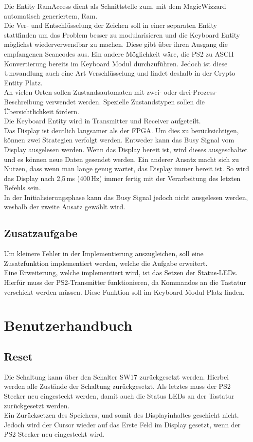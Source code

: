 \documentclass[a4paper,12pt]{report}
\begin{document}
	Die Entity RamAccess dient als Schnittstelle zum, mit dem MagicWizzard automatisch generiertem, Ram.\\
	Die Ver- und Entschlüsselung der Zeichen soll in einer separaten Entity stattfinden um das Problem besser zu modularisieren und die Keyboard Entity möglichst wiederverwendbar zu machen. Diese gibt über ihren Ausgang die empfangenen Scancodes aus. Ein andere Möglichkeit wäre, die PS2 zu ASCII Konvertierung bereits im Keyboard Modul durchzuführen. Jedoch ist diese Umwandlung auch eine Art Verschlüsselung und findet deshalb in der Crypto Entity Platz.\\
	An vielen Orten sollen Zustandsautomaten mit zwei- oder drei-Prozess-Beschreibung verwendet werden. Spezielle Zustandstypen sollen die Übersichtlichkeit fördern.\\
	Die Keyboard Entity wird in Transmitter und Receiver aufgeteilt.\\
	Das Display ist deutlich langsamer als der FPGA. Um dies zu berücksichtigen, können zwei Strategien verfolgt werden. Entweder kann das Busy Signal vom Display ausgelesen werden. Wenn das Display bereit ist, wird dieses ausgeschaltet und es können neue Daten gesendet werden. Ein anderer Ansatz macht sich zu Nutzen, dass wenn man lange genug wartet, das Display immer bereit ist. So wird das Display nach 2,5\,ms (400\,Hz) immer fertig mit der Verarbeitung des letzten Befehls sein. \\
	In der Initialisierungsphase kann das Busy Signal jedoch nicht ausgelesen werden, weshalb der zweite Ansatz gewählt wird.\\
	
	
	\section{Zusatzaufgabe}
		Um kleinere Fehler in der Implementierung auszugleichen, soll eine Zusatzfunktion implementiert werden, welche die Aufgabe erweitert.\\
		Eine Erweiterung, welche implementiert wird, ist das Setzen der Status-LEDs. Hierfür muss der PS2-Transmitter funktionieren, da Kommandos an die Tastatur verschickt werden müssen. Diese Funktion soll im Keyboard Modul Platz finden.   
	
\chapter{Benutzerhandbuch}
	\section{Reset}
		Die Schaltung kann über den Schalter SW17 zurückgesetzt werden. Hierbei werden alle Zustände der Schaltung zurückgesetzt. Als letztes muss der PS2 Stecker neu eingesteckt werden, damit auch die Status LEDs an der Tastatur zurückgesetzt werden.\\
		Ein Zurücksetzen des Speichers, und somit des Displayinhaltes geschieht nicht. Jedoch wird der Cursor wieder auf das Erste Feld im Display gesetzt, wenn der PS2 Stecker neu eingesteckt wird.
		
\end{document}
